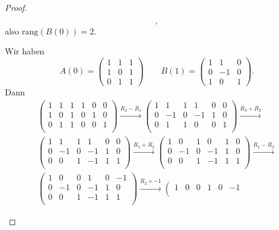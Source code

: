 \begin{proof}
\begin{parts}
\[,\]
also $\text{rang}(B(0))=2$.
\item Wir haben
	\[
		A(0)=\begin{pmatrix}  1 & 1 & 1 \\ 1 & 0 & 1 \\ 0 & 1 & 1 \end{pmatrix} \qquad B(1)=\begin{pmatrix} 1 & 1 & 0 \\ 0 & -1 & 0 \\ 1 & 0 & 1 \end{pmatrix} 
	.\] 
Dann
\begin{gather*}
	\left(
\begin{array}{ccc|ccc}
 1 & 1 & 1 & 1 & 0 & 0 \\
 1 & 0 & 1 & 0 & 1 & 0 \\
 0 & 1 & 1 & 0 & 0 & 1 \\
\end{array}
\right) \xrightarrow{R_2-R_1} \left(
\begin{array}{ccc|ccc}
 1 & 1 & 1 & 1 & 0 & 0 \\
 0 & -1 & 0 & -1 & 1 & 0 \\
 0 & 1 & 1 & 0 & 0 & 1 \\
\end{array}
\right) \xrightarrow{R_3+R_2} \\\left(
\begin{array}{ccc|ccc}
 1 & 1 & 1 & 1 & 0 & 0 \\
 0 & -1 & 0 & -1 & 1 & 0 \\
 0 & 0 & 1 & -1 & 1 & 1 \\
\end{array}
\right) \xrightarrow{R_1+R_2} \left(
\begin{array}{ccc|ccc}
 1 & 0 & 1 & 0 & 1 & 0 \\
 0 & -1 & 0 & -1 & 1 & 0 \\
 0 & 0 & 1 & -1 & 1 & 1 \\
\end{array}
\right) \xrightarrow{R_1-R_3} \\\left(
\begin{array}{ccc|ccc}
 1 & 0 & 0 & 1 & 0 & -1 \\
 0 & -1 & 0 & -1 & 1 & 0 \\
 0 & 0 & 1 & -1 & 1 & 1 \\
\end{array}
\right) \xrightarrow{R_2\times -1} \left(
\begin{array}{ccc|ccc}
 1 & 0 & 0 & 1 & 0 & -1 \\

\end{array}
\end{gather*}
\end{parts}
\end{proof}
